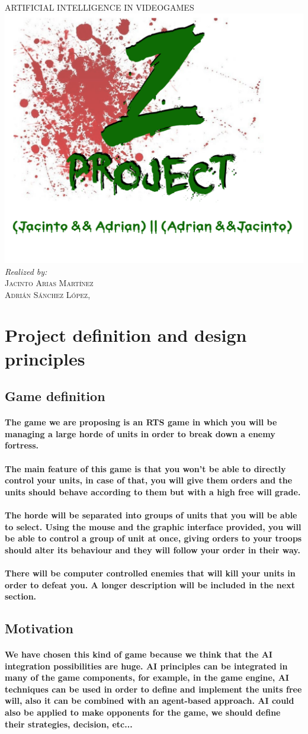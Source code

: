\documentclass[a4paper,10pt]{article}
\newcommand{\titulo}[2]{ \begin{titlepage}\begin{center}\vspace*{\fill}\textsc{\Huge #1}\\[3cm]  \includegraphics[scale=0.3]{./zlogo.png} \\[3cm]\emph{Realized by:}\\ \textsc{Jacinto Arias Martínez}\\ \textsc{Adrián Sánchez López}\vspace*{\fill}\vfill\monthname[\the\month],\, \the\year\end{center}\end{titlepage}}
\newcommand{\p}[1]{\paragraph{\indent\textnormal{#1}}}
\begin{document}
 \titulo{ARTIFICIAL INTELLIGENCE IN VIDEOGAMES}{Practice project}

    \begin{abstract}
    
    \end{abstract}

  \newpage

  \vspace*{3cm}
  \tableofcontents
  \vspace*{\fill}

\newpage
\section{Project definition and design principles}

  \subsection{Game definition}

    \p{The game we are proposing is an \textbf{RTS} game in which you will be managing a large horde of units in order to break down a enemy fortress.}

    \p{The main feature of this game is that you won't be able to directly control your units, in case of that, you will give them orders and the units should behave according to them but with a high free will grade.}

    \p{The horde will be separated into groups of units that you will be able to select. Using the mouse and the graphic interface provided, you will be able to control a group of unit at once, giving orders to your troops should alter its behaviour and they will follow your order in their way.}

    \p{There will be computer controlled enemies that will kill your units in order to defeat you. A longer description will be included in the next section.}


  \subsection{Motivation}

    \p{We have chosen this kind of game because we think that the AI integration possibilities are huge. AI principles can be integrated in many of the game components, for example, in the game engine, AI techniques can be used in order to define and implement the units free will, also it can be combined with an agent-based approach. AI could also be applied to make opponents for the game, we should define their strategies, decision, etc...}
\end{document}
